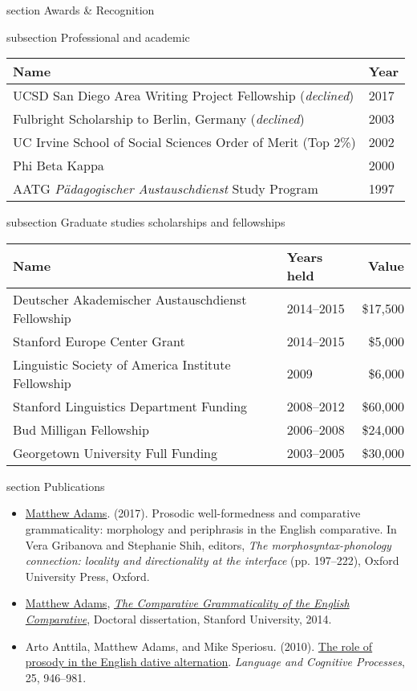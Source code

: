 \documentclass[10pt]{article}
\newcommand{\sectionhead}[1]{%
\begin{bgbox}{section}%
{\Large \textsf{#1}}%
\end{bgbox}%
}
\newcommand{\subsectionhead}[1]{%
\begin{bgbox}{subsection}%
{\small \textsf{#1}}%
\end{bgbox}%
}
\begin{document}
\newpage
\sectionhead{Awards \& Recognition}
\label{Awards}
\subsectionhead{Professional and academic}
\label{sec:org0a2b1ed}

\begin{center}
\begin{tabular}{ll}
\hline
\textbf{Name} & \textbf{Year}\\
\hline
UCSD San Diego Area Writing Project Fellowship (\emph{declined}) & 2017\\
Fulbright Scholarship to Berlin, Germany (\emph{declined}) & 2003\\
UC Irvine School of Social Sciences Order of Merit (Top 2\%) & 2002\\
Phi Beta Kappa & 2000\\
AATG \emph{Pädagogischer Austauschdienst} Study Program & 1997\\
\hline
\end{tabular}
\end{center}

\subsectionhead{Graduate studies scholarships and fellowships}
\label{Graduate-studies-scholarships-and-fellowships}
\begin{center}
\begin{tabular}{llr}
\hline
\textbf{Name} & \textbf{Years held} & \textbf{Value}\\
\hline
Deutscher Akademischer Austauschdienst Fellowship & 2014--2015 & \$17,500\\
Stanford Europe Center Grant & 2014--2015 & \$5,000\\
Linguistic Society of America Institute Fellowship & 2009 & \$6,000\\
Stanford Linguistics Department Funding & 2008--2012 & \$60,000\\
Bud Milligan Fellowship & 2006--2008 & \$24,000\\
Georgetown University Full Funding & 2003--2005 & \$30,000\\
\hline
\end{tabular}
\end{center}
\sectionhead{Publications}
\label{Publications}
\small

\begin{itemize}
\item \href{https://scholar.google.com/citations?user=-k9s2XwAAAAJ\&hl=en}{Matthew Adams}. (2017). Prosodic well-formedness and comparative grammaticality: morphology and periphrasis in the English comparative. In Vera Gribanova and Stephanie Shih, editors, \emph{The morphosyntax-phonology connection: locality and directionality at the interface} (pp. 197--222), Oxford University Press, Oxford.
\item \href{https://scholar.google.com/citations?user=-k9s2XwAAAAJ\&hl=en}{Matthew Adams}, \emph{\href{https://searchworks.stanford.edu/view/10530947}{The Comparative Grammaticality of the English Comparative}}, Doctoral dissertation, Stanford University, 2014.
\item Arto Anttila, Matthew Adams, and Mike Speriosu. (2010). \href{http://www.tandfonline.com/doi/full/10.1080/01690960903525481}{The role of prosody in the English dative alternation}. \emph{Language and Cognitive Processes}, 25, 946--981.
\end{itemize}
\end{document}
